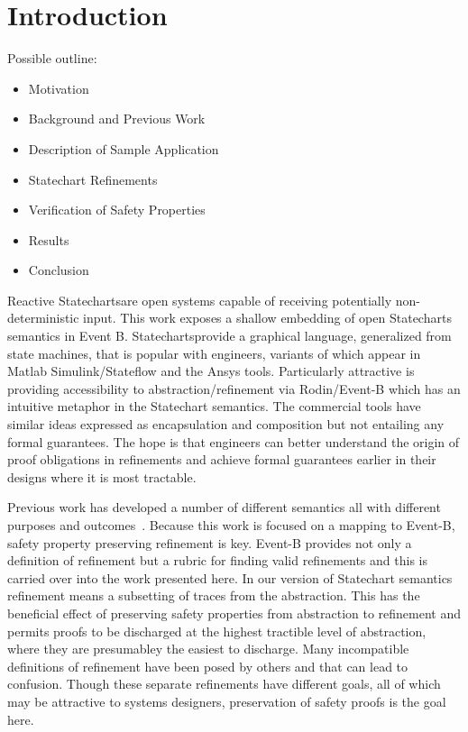 

\section{Introduction}

Possible outline:
\begin{itemize}
\item Motivation
\item Background and Previous Work
\item Description of Sample Application
\item Statechart Refinements
\item Verification of Safety Properties 
\item Results
\item Conclusion 
\end{itemize}

\newcommand{\SCs}{{{Statecharts}}}
\newcommand{\SC}{{{Statechart}}}


  Reactive \SCs are open systems capable of receiving potentially non-deterministic input.  This work
exposes a shallow embedding of open \SCs\cite{} semantics in Event B.
\SCs provide a graphical language, generalized from state
machines, that is popular with engineers, variants of which appear in
Matlab Simulink/Stateflow\cite{} and the Ansys tools.  Particularly
attractive is providing accessibility to abstraction/refinement via
Rodin/Event-B which has an intuitive metaphor in the Statechart
semantics\cite{prev-work}.  The commercial tools have similar ideas
expressed as encapsulation and composition but not entailing any
formal guarantees.  The hope is that engineers can better understand
the origin of proof obligations in refinements and achieve formal
guarantees earlier in their designs where it is most tractable.

Previous work has developed a number of different semantics all with
different purposes and
outcomes~\cite{Syriani_2019,Harel,Maraninchi91theargos}.  Because this
work is focused on a mapping to Event-B, safety property preserving
refinement is key.  Event-B provides not only a definition of
refinement but a rubric for finding valid refinements and this is
carried over into the work presented here.  In our version of \SC
semantics refinement means a subsetting of traces from the
abstraction.  This has the beneficial effect of preserving safety
properties from abstraction to refinement and permits proofs to be
discharged at the highest tractible level of abstraction, where they
are presumabley the easiest to discharge. Many incompatible
definitions of refinement have been posed by
others\cite{Syriani_2019,Maraninchi91theargos} and that can lead to
confusion.  Though these separate refinements have different goals,
all of which may be attractive to systems designers, preservation of
safety proofs is the goal here.

